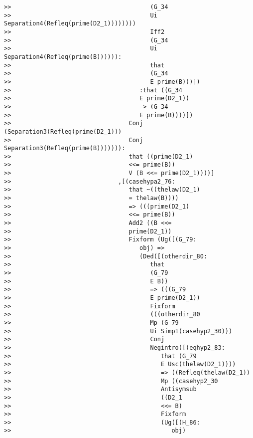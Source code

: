 \documentclass[12pt]{article}
\begin{document}
\begin{verbatim}
>>                                       (G_34
>>                                       Ui Separation4(Refleq(prime(D2_1))))))))
>>                                       Iff2
>>                                       (G_34
>>                                       Ui Separation4(Refleq(prime(B)))))):
>>                                       that
>>                                       (G_34
>>                                       E prime(B)))])
>>                                    :that ((G_34
>>                                    E prime(D2_1))
>>                                    -> (G_34
>>                                    E prime(B))))])
>>                                 Conj (Separation3(Refleq(prime(D2_1)))
>>                                 Conj Separation3(Refleq(prime(B))))))):
>>                                 that ((prime(D2_1)
>>                                 <<= prime(B))
>>                                 V (B <<= prime(D2_1))))]
>>                              ,[(casehypa2_76:
>>                                 that ~((thelaw(D2_1)
>>                                 = thelaw(B))))
>>                                 => (((prime(D2_1)
>>                                 <<= prime(B))
>>                                 Add2 ((B <<=
>>                                 prime(D2_1))
>>                                 Fixform (Ug([(G_79:
>>                                    obj) =>
>>                                    (Ded([(otherdir_80:
>>                                       that
>>                                       (G_79
>>                                       E B))
>>                                       => (((G_79
>>                                       E prime(D2_1))
>>                                       Fixform
>>                                       (((otherdir_80
>>                                       Mp (G_79
>>                                       Ui Simp1(casehyp2_30)))
>>                                       Conj
>>                                       Negintro([(eqhyp2_83:
>>                                          that (G_79
>>                                          E Usc(thelaw(D2_1))))
>>                                          => ((Refleq(thelaw(D2_1))
>>                                          Mp ((casehyp2_30
>>                                          Antisymsub
>>                                          ((D2_1
>>                                          <<= B)
>>                                          Fixform
>>                                          (Ug([(H_86:
>>                                             obj)

\end{verbatim}
\end{document}
